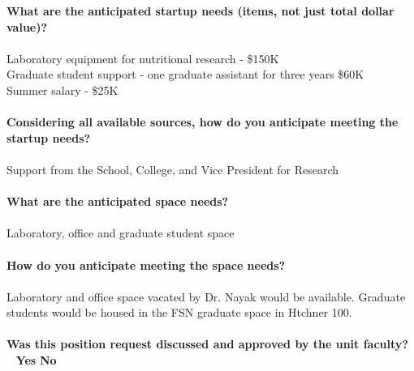 \documentclass[11pt]{article}
\begin{document}
\vfill
\newpage\noindent\textbf{\rmfamily What are the anticipated startup needs (items, not just total dollar value)?}\\~\\
Laboratory equipment for nutritional research - \$150K \\
Graduate student support - one graduate assistant for three years \$60K\\
Summer salary - \$25K\\~\\
\vfill
\noindent\textbf{\rmfamily Considering all available sources, how do you anticipate meeting the startup needs?}\\~\\
Support from the School, College, and Vice President for Research\\~\\
\vfill
\noindent\textbf{\rmfamily What are the anticipated space needs?}\\~\\ Laboratory, office and graduate student space\\~\\
\vfill
\noindent\textbf{\rmfamily How do you anticipate meeting the space needs?} \\~\\
Laboratory and office space vacated by Dr. Nayak would be available. Graduate students would be housed in the FSN graduate space in Htchner 100.\\~\\
\vfill
\noindent\textbf{\rmfamily Was this position request discussed and approved by the unit faculty?} \hfill ~ \hfill \textbf{\Large{\HollowBox} \normalsize{Yes}} \hfill \textbf{\Large{\HollowBox} \normalsize{ No}}\\~\\%
\end{document}
